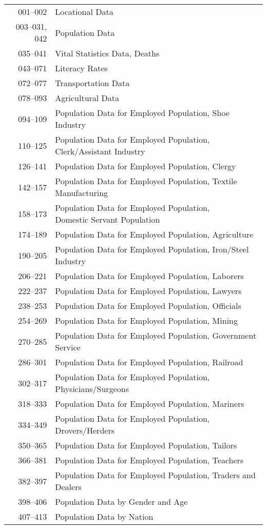 ﻿\documentclass[12pt]{report}
\begin{document}
	\begin{tabular}{r|l}
		001--002 & Locational Data\\
		003--031, 042 & Population Data\\
		035--041 & Vital Statistics Data, Deaths\\
		043--071 & Literacy Rates\\
		072--077 & Transportation Data\\
		078--093 & Agricultural Data\\
		094--109 & Population Data for Employed Population, Shoe Industry\\
		110--125 & Population Data for Employed Population, Clerk/Assistant Industry\\
		126--141 & Population Data for Employed Population, Clergy\\
		142--157 & Population Data for Employed Population, Textile Manufacturing\\
		158--173 & \parbox[t]{10cm}{Population Data for Employed Population,\\ Domestic Servant Population}\\
		174--189 & Population Data for Employed Population, Agriculture\\
		190--205 & Population Data for Employed Population, Iron/Steel Industry\\
		206--221 & Population Data for Employed Population, Laborers\\
		222--237 & Population Data for Employed Population, Lawyers\\
		238--253 & Population Data for Employed Population, Officials\\
		254--269 & Population Data for Employed Population, Mining\\
		270--285 & Population Data for Employed Population, Government Service\\
		286--301 & Population Data for Employed Population, Railroad\\
		302--317 & Population Data for Employed Population, Physicians/Surgeons\\
		318--333 & Population Data for Employed Population, Mariners\\
		334--349 & Population Data for Employed Population, Drovers/Herders\\
		350--365 & Population Data for Employed Population, Tailors\\
		366--381 & Population Data for Employed Population, Teachers\\
		382--397 & Population Data for Employed Population, Traders and Dealers\\
		398--406 & Population Data by Gender and Age\\
		407--413 & Population Data by Nation
	\end{tabular}
\end{document}
